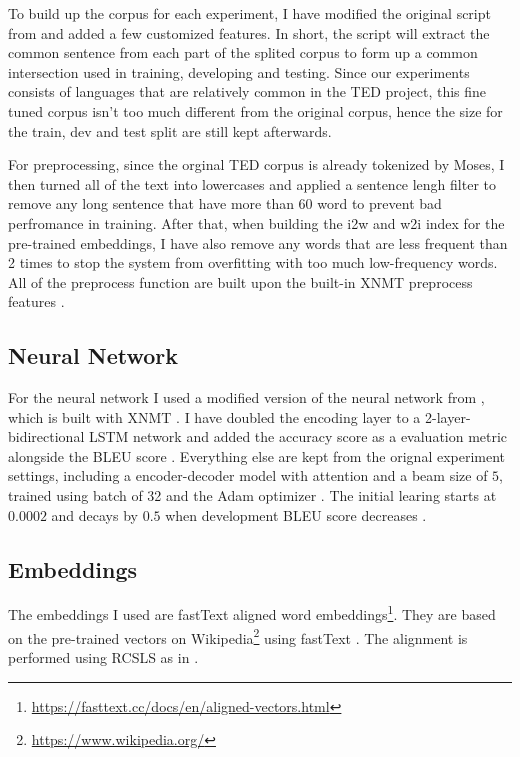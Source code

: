 \documentclass[thesis,fonts=libertine]{cluu}
\begin{document}
To build up the corpus for each experiment, I have modified the original script from \cite{Qi:2018aa} and added a few customized features. In short, the script will extract the common sentence from each part of the splited corpus to form up a common intersection used in training, developing and testing. Since our experiments consists of languages that are relatively common in the TED project, this fine tuned corpus isn't too much different from the original corpus, hence the size for the train, dev and test split are still kept afterwards.

For preprocessing, since the orginal TED corpus is already tokenized by Moses, I then turned all of the text into lowercases and applied a sentence lengh filter to remove any long sentence that have more than 60 word to prevent bad perfromance in training. After that, when building the i2w and w2i index for the pre-trained embeddings, I have also remove any words that are less frequent than 2 times to stop the system from overfitting with too much low-frequency words. All of the preprocess function are built upon the built-in XNMT preprocess features \parencite{Neubig:2018aa}.

\subsection{Neural Network}

For the neural network I used a modified version of the neural network from \cite{Qi:2018aa}, which is built with XNMT \cite{Neubig:2018aa}. I have doubled the encoding layer to a 2-layer-bidirectional LSTM network and added the accuracy score as a evaluation metric alongside the BLEU score \parencite{papineni-etal-2002-bleu}. Everything else are kept from the orignal experiment settings, including a encoder-decoder model with attention \parencite{Bahdanau:2014aa} and a beam size of $5$, trained using batch of 32 and the Adam optimizer \parencite{Kingma:2014aa}. The initial learing starts at $0.0002$ and decays by $0.5$ when development BLEU score decreases \parencite{Denkowski:2017aa}.

\subsection{Embeddings}

The embeddings I used are fastText aligned word embeddings\footnote{\url{https://fasttext.cc/docs/en/aligned-vectors.html}}. They are based on the pre-trained vectors on Wikipedia\footnote{\url{https://www.wikipedia.org/}} using fastText \parencite{Bojanowski:2016aa}. The alignment is performed using RCSLS as in \cite{Joulin:2018aa}.
\end{document}
